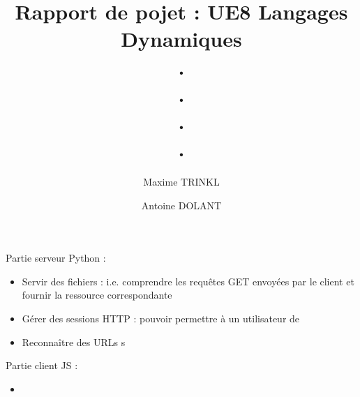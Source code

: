 \documentclass[10pt]{report}
\title{\Huge Rapport de pojet : UE8 Langages Dynamiques\\ . \\ . \\ . \\ . }
\author{Maxime TRINKL \and Antoine DOLANT}
\begin{document}
\maketitle
\newpage
Partie serveur Python : 
\begin{itemize}
\item Servir des fichiers : i.e. comprendre les requêtes GET envoyées par le client et fournir la ressource correspondante
\item Gérer des sessions HTTP : pouvoir permettre à un utilisateur de 
\item Reconnaître des URLs s

\end{itemize}


Partie client JS :
\begin{itemize}
\item 


\end{itemize}
\end{document}
